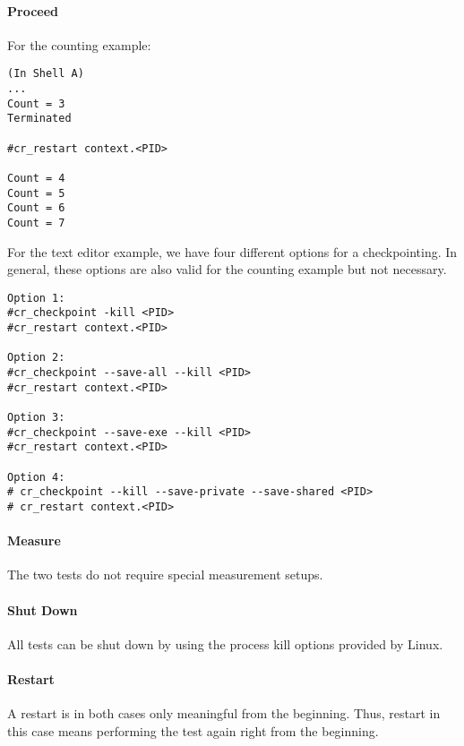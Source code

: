 \paragraph{Proceed}

For the counting example:
\begin{lstlisting}
(In Shell A)
... 
Count = 3
Terminated

#cr_restart context.<PID>

Count = 4
Count = 5
Count = 6
Count = 7
\end{lstlisting}
For the text editor example, we have four different options for a checkpointing. In general, these options are also valid for the counting example but not necessary.
\begin{lstlisting}
Option 1:
#cr_checkpoint -kill <PID>
#cr_restart context.<PID>

Option 2:
#cr_checkpoint --save-all --kill <PID>
#cr_restart context.<PID>

Option 3:
#cr_checkpoint --save-exe --kill <PID>
#cr_restart context.<PID>

Option 4:
# cr_checkpoint --kill --save-private --save-shared <PID>
# cr_restart context.<PID>
\end{lstlisting}

\paragraph{Measure}
The two tests do not require special measurement setups.

\paragraph{Shut Down}
All tests can be shut down by using the process kill options provided by Linux.

\paragraph{Restart}
A restart is in both cases only meaningful from the beginning. Thus, restart in this case means performing the test again right from the beginning.


